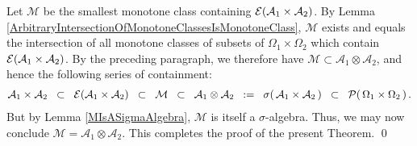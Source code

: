 \vskip 0.3cm
\noindent
Let $\mathcal{M}$ be the smallest monotone class containing
$\mathcal{E}\!\left(\mathcal{A}_{1}\times\mathcal{A}_{2}\right)$.
By Lemma \ref{ArbitraryIntersectionOfMonotoneClassesIsMonotoneClass},
$\mathcal{M}$ exists and equals the intersection of all monotone classes of subsets
of $\Omega_{1}\times\Omega_{2}$ which contain
$\mathcal{E}\!\left(\mathcal{A}_{1}\times\mathcal{A}_{2}\right)$.
By the preceding paragraph, we therefore have
$\mathcal{M} \subset \mathcal{A}_{1}\otimes\mathcal{A}_{2}$,
and hence the following series of containment:
\begin{eqnarray*}
\mathcal{A}_{1} \times \mathcal{A}_{2}
\;\; \subset \;\; \mathcal{E}\!\left(\mathcal{A}_{1}\times\mathcal{A}_{2}\right)
\;\; \subset \;\; \mathcal{M}
\;\; \subset \;\; \mathcal{A}_{1}\otimes\mathcal{A}_{2}
\;\; := \;\; \sigma\!\left(\, \mathcal{A}_{1} \times \mathcal{A}_{2} \,\right)
\;\; \subset \;\; \mathcal{P}\!\left(\,\Omega_{1}\times\Omega_{2}\,\right).
\end{eqnarray*}
But by Lemma \ref{MIsASigmaAlgebra}, $\mathcal{M}$ is itself a $\sigma$-algebra.
Thus, we may now conclude
$\mathcal{M} = \mathcal{A}_{1}\otimes\mathcal{A}_{2}$.
This completes the proof of the present Theorem.
\qed

